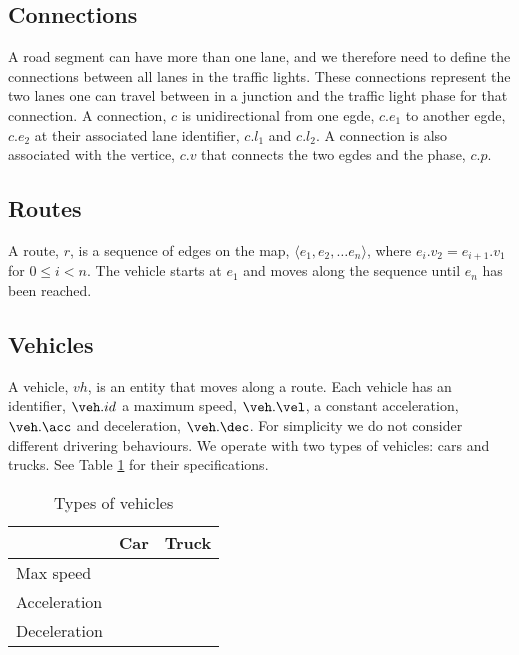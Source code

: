 \subsection{Connections}
A road segment can have more than one lane, and we therefore need to define the connections between all lanes in the traffic lights.
These connections represent the two lanes one can travel between in a junction and the traffic light phase for that connection.
A connection, $c$ is unidirectional from one egde, $c.e_1$ to another egde, $c.e_2$ at their associated lane identifier, $c.l_1$ and $c.l_2$. A connection is also associated with the vertice, $c.v$ that connects the two egdes and the phase, $c.p$.



\begin{comment}
\subsection{Trajectory}
A trajectory, $T$, is a sequence of connected edges on the map, $\langle e_1, e_2, \dots e_n \rangle$, where $e_i.v_2 = e_{i+1}.v_1$ for $0\leq i< n$.
The vehicle starts at $e_1$ and moves along the sequence until $e_n$ has been reached.
\end{comment}

\subsection{Routes}
A route, $r$, is a sequence of edges on the map, $\langle e_1, e_2, \dots e_n \rangle$, where $e_i.v_2 = e_{i+1}.v_1$ for $0\leq i< n$.
The vehicle starts at $e_1$ and moves along the sequence until $e_n$ has been reached.

\subsection{Vehicles}
A vehicle, $vh$, is an entity that moves along a route.
Each vehicle has an identifier, $\veh.id$ a maximum speed, $\veh.\vel$, a constant acceleration, $\veh.\acc$ and deceleration, $\veh.\dec$.
For simplicity we do not consider different drivering behaviours.
We operate with two types of vehicles: cars and trucks. See Table \ref{table.vehicleTypes} for their specifications.
\begin{table}
\centering
\begin{tabular}{|l|l|l|}\hline
		& Car	& Truck \\\hline
Max speed 	& 	& \\\hline
Acceleration 	&	& \\\hline
Deceleration 	&	& \\\hline
\end{tabular}
\caption{Types of vehicles}\label{table.vehicleTypes}
\end{table}

